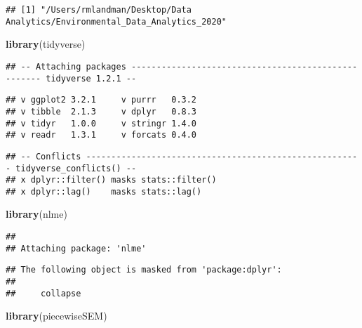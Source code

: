 \documentclass[]{article}
\newenvironment{Shaded}{\begin{snugshade}}{\end{snugshade}}
\newcommand{\CommentTok}[1]{\textcolor[rgb]{0.56,0.35,0.01}{\textit{#1}}}
\newcommand{\KeywordTok}[1]{\textcolor[rgb]{0.13,0.29,0.53}{\textbf{#1}}}
\newcommand{\NormalTok}[1]{#1}
\begin{document}
\begin{Shaded}
\end{Shaded}

\begin{verbatim}
## [1] "/Users/rmlandman/Desktop/Data Analytics/Environmental_Data_Analytics_2020"
\end{verbatim}

\begin{Shaded}
\begin{Highlighting}[]
\KeywordTok{library}\NormalTok{(tidyverse)}
\end{Highlighting}
\end{Shaded}

\begin{verbatim}
## -- Attaching packages ---------------------------------------------------- tidyverse 1.2.1 --
\end{verbatim}

\begin{verbatim}
## v ggplot2 3.2.1     v purrr   0.3.2
## v tibble  2.1.3     v dplyr   0.8.3
## v tidyr   1.0.0     v stringr 1.4.0
## v readr   1.3.1     v forcats 0.4.0
\end{verbatim}

\begin{verbatim}
## -- Conflicts ------------------------------------------------------- tidyverse_conflicts() --
## x dplyr::filter() masks stats::filter()
## x dplyr::lag()    masks stats::lag()
\end{verbatim}

\begin{Shaded}
\begin{Highlighting}[]
\KeywordTok{library}\NormalTok{(nlme)}
\end{Highlighting}
\end{Shaded}

\begin{verbatim}
## 
## Attaching package: 'nlme'
\end{verbatim}

\begin{verbatim}
## The following object is masked from 'package:dplyr':
## 
##     collapse
\end{verbatim}

\begin{Shaded}
\begin{Highlighting}[]
\KeywordTok{library}\NormalTok{(piecewiseSEM)}
\end{Highlighting}
\end{Shaded}
\end{document}
